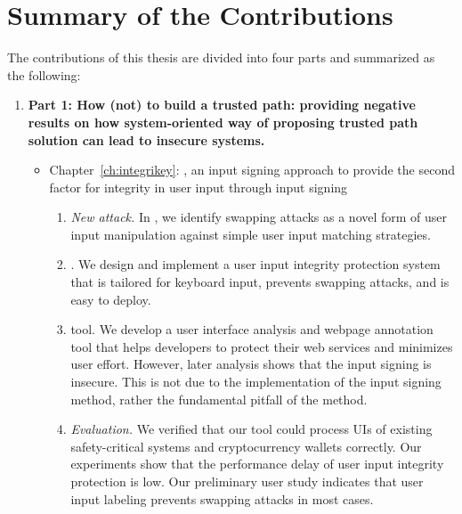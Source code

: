 \section{Summary of the Contributions}

The contributions of this thesis are divided into four parts and summarized as the following:

\begin{enumerate}[leftmargin=*]
  
  \item[] \textbf{Part 1: How (not) to build a trusted path: providing negative results on how system-oriented way of proposing trusted path solution can lead to insecure systems.}
  
  \begin{itemize}
  \item Chapter~\ref{ch:integrikey}: \integrikey, an input signing approach to provide the second factor for integrity in user input through input signing

\begin{enumerate}
    \item \emph{New attack.} In \integrikey, we identify swapping attacks as a novel form of user input manipulation against simple user input matching strategies.
    \item \integrikey. We design and implement a user input integrity protection system that is tailored for keyboard input, prevents swapping attacks, and is easy to deploy.
    \item \integrikey{} tool. We develop a user interface analysis and webpage annotation tool that helps developers to protect their web services and minimizes user effort. However, later analysis shows that the input signing is insecure. This is not due to the implementation of the input signing method, rather the fundamental pitfall of the method.
    \item \emph{Evaluation.} We verified that our tool could process UIs of existing safety-critical systems and cryptocurrency wallets correctly. Our experiments show that the performance delay of \integrikey user input integrity protection is low. Our preliminary user study indicates that user input labeling prevents swapping attacks in most cases.
\end{enumerate}


\end{itemize}
\end{enumerate}

